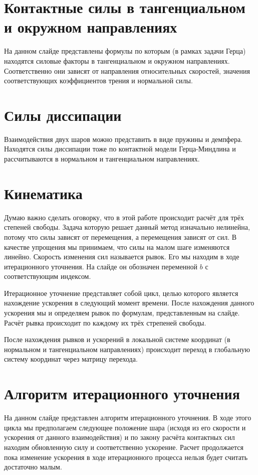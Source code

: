 \documentclass[a4paper]{article}
\begin{document}
\section{Контактные силы в тангенциальном и окружном направлениях}

На данном слайде представлены формулы по которым (в рамках задачи Герца) находятся силовые факторы в тангенциальном и окружном направлениях. 
Соответственно они зависят от направления относительных скоростей, значения соответствующих коэффициентов трения и нормальной силы.


\section{Силы диссипации}

Взаимодействия двух шаров можно представить в виде пружины и демпфера.
Находятся силы диссипации тоже по контактной модели Герца-Миндлина и рассчитываются в нормальном и тангенциальном направлениях.

\section{Кинематика}

Думаю важно сделать оговорку, что в этой работе происходит расчёт для трёх степеней свободы.
Задача которую решает данный метод изначально нелинейна, потому что силы зависят от перемещения, а перемещения зависят от сил. 
В качестве упрощения мы принимаем, что силы на  малом шаге изменяются линейно.
Скорость изменения сил называется рывок.
Его мы находим в ходе итерационного уточнения.
На слайде он обозначен переменной $b$ с соответствующим индексом.

Итерационное уточнение представляет собой цикл, целью которого является нахождение ускорения в следующий момент времени.
После нахождения данного ускорения мы и определяем рывок по формулам, представленным на слайде.
Расчёт рывка происходит по каждому их трёх стрепеней свободы.

После нахождения рывков и ускорений в локальной системе координат (в нормальном и тангенциальном направлениях) происходит переход в глобальную систему координат через матрицу перехода.

\section{Алгоритм итерационного уточнения}

На данном слайде представлен алгоритм итерационного уточнения.
В ходе этого цикла мы предполагаем следующее положение шара (исходя из его скорости и ускорения от данного взаимодействия) и по закону расчёта контактных сил находим обновленную силу и соответственно ускорение.
Расчет продолжается пока изменение ускорения в ходе итерационного процесса нельзя будет считать достаточно малым.
\end{document}
